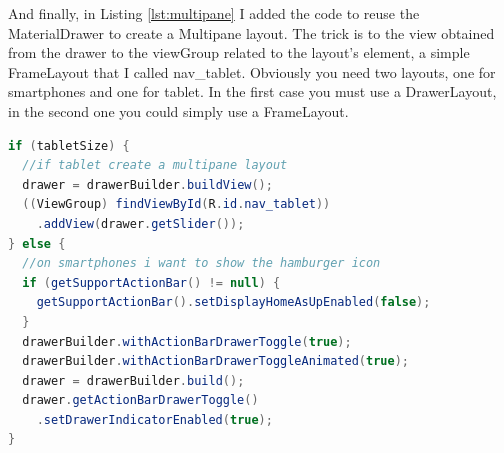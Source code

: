 And finally, in Listing \ref{lst:multipane} I added the code to reuse the MaterialDrawer to create a Multipane layout. The trick is to the view obtained from the drawer to the viewGroup related to the layout's element, a simple FrameLayout that I called \textsf{nav\_tablet}. Obviously you need two layouts, one for smartphones and one for tablet. In the first case you must use a DrawerLayout, in the second one you could simply use a FrameLayout.


\begin{lstlisting}[caption={Reuse Drawer for Multi-pane layout},label=lst:multipane, language=Java]
if (tabletSize) {
  //if tablet create a multipane layout
  drawer = drawerBuilder.buildView();
  ((ViewGroup) findViewById(R.id.nav_tablet))
    .addView(drawer.getSlider());
} else {
  //on smartphones i want to show the hamburger icon
  if (getSupportActionBar() != null) {
    getSupportActionBar().setDisplayHomeAsUpEnabled(false);
  }
  drawerBuilder.withActionBarDrawerToggle(true);
  drawerBuilder.withActionBarDrawerToggleAnimated(true);
  drawer = drawerBuilder.build();
  drawer.getActionBarDrawerToggle()
    .setDrawerIndicatorEnabled(true);
}
\end{lstlisting}


